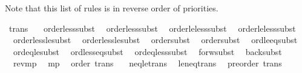 \begin{isabellebody}
\isanewline
{}\isamarkupfalse%
%
\endisatagproof
{\isafoldproof}%
%
\isadelimproof
%
\endisadelimproof
%
\begin{isamarkuptext}%
Note that this list of rules is in reverse order of priorities.%
\end{isamarkuptext}\isamarkuptrue%
\isamarkupfalse%
\ {\isacharbrackleft}{\kern0pt}trans{\isacharbrackright}{\kern0pt}\ {\isacharequal}{\kern0pt}\isanewline
\ \ order{\isacharunderscore}{\kern0pt}less{\isacharunderscore}{\kern0pt}subst{}\isanewline
\ \ order{\isacharunderscore}{\kern0pt}less{\isacharunderscore}{\kern0pt}subst{}\isanewline
\ \ order{\isacharunderscore}{\kern0pt}le{\isacharunderscore}{\kern0pt}less{\isacharunderscore}{\kern0pt}subst{}\isanewline
\ \ order{\isacharunderscore}{\kern0pt}le{\isacharunderscore}{\kern0pt}less{\isacharunderscore}{\kern0pt}subst{}\isanewline
\ \ order{\isacharunderscore}{\kern0pt}less{\isacharunderscore}{\kern0pt}le{\isacharunderscore}{\kern0pt}subst{}\isanewline
\ \ order{\isacharunderscore}{\kern0pt}less{\isacharunderscore}{\kern0pt}le{\isacharunderscore}{\kern0pt}subst{}\isanewline
\ \ order{\isacharunderscore}{\kern0pt}subst{}\isanewline
\ \ order{\isacharunderscore}{\kern0pt}subst{}\isanewline
\ \ ord{\isacharunderscore}{\kern0pt}le{\isacharunderscore}{\kern0pt}eq{\isacharunderscore}{\kern0pt}subst\isanewline
\ \ ord{\isacharunderscore}{\kern0pt}eq{\isacharunderscore}{\kern0pt}le{\isacharunderscore}{\kern0pt}subst\isanewline
\ \ ord{\isacharunderscore}{\kern0pt}less{\isacharunderscore}{\kern0pt}eq{\isacharunderscore}{\kern0pt}subst\isanewline
\ \ ord{\isacharunderscore}{\kern0pt}eq{\isacharunderscore}{\kern0pt}less{\isacharunderscore}{\kern0pt}subst\isanewline
\ \ forw{\isacharunderscore}{\kern0pt}subst\isanewline
\ \ back{\isacharunderscore}{\kern0pt}subst\isanewline
\ \ rev{\isacharunderscore}{\kern0pt}mp\isanewline
\ \ mp\isanewline
\isanewline
{}\isamarkupfalse%
\ {\isacharparenleft}{\kern0pt}\ order{\isacharparenright}{\kern0pt}\ {\isacharbrackleft}{\kern0pt}trans{\isacharbrackright}{\kern0pt}\ {\isacharequal}{\kern0pt}\isanewline
\ \ neq{\isacharunderscore}{\kern0pt}le{\isacharunderscore}{\kern0pt}trans\isanewline
\ \ le{\isacharunderscore}{\kern0pt}neq{\isacharunderscore}{\kern0pt}trans\isanewline
\isanewline
{}\isamarkupfalse%
\ {\isacharparenleft}{\kern0pt}\ preorder{\isacharparenright}{\kern0pt}\ {\isacharbrackleft}{\kern0pt}trans{\isacharbrackright}{\kern0pt}\ {\isacharequal}{\kern0pt}\isanewline

\end{isabellebody}
